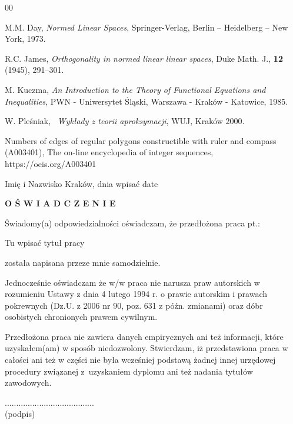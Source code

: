 \documentclass[12pt,oneside,a4paper]{book} %
\theoremstyle{break}
\begin{document}
\begin{thebibliography}{00}

M.M. Day, \textit{Normed Linear Spaces}, Springer-Verlag, Berlin
-- Heidelberg -- New York, 1973.

 R.C. James, \textit{Orthogonality in normed linear linear spaces}, Duke Math. J., {\bf
12} (1945), 291--301.

 M. Kuczma, \textit{An Introduction to the
Theory of Functional Equations and Inequalities}, PWN -
Uniwersytet Śląski, Warszawa - Kraków - Katowice, 1985.

W. Pleśniak, \  \textit{Wykłady z teorii aproksymacji}, WUJ,
Kraków 2000.

Numbers of edges of regular polygons constructible with ruler and compass (A003401), The on-line encyclopedia of integer sequences, https://oeis.org/A003401 

\end{thebibliography}
\newpage\thispagestyle{empty}
Imię i Nazwisko \hfill Kraków, dnia wpisać date\par\vspace{1cm}\par
\centerline{{\Large \bf O Ś W I A D C Z E N I E}}
\par\vspace{1.4cm}\par
Świadomy(a) odpowiedzialności oświadczam, że przedłożona praca pt.:
\begin{center}
{\sc Tu wpisać tytuł pracy}
\end{center}
została napisana przeze mnie samodzielnie.
\par
Jednocześnie oświadczam że w/w praca nie narusza praw autorskich w rozumieniu Ustawy z dnia 4 lutego 1994 r. o prawie autorskim i prawach pokrewnych (Dz.U. z 2006 nr 90, poz.
631 z późn. zmianami) oraz dóbr osobistych chronionych prawem cywilnym.
\par
Przedłożona praca nie zawiera danych empirycznych ani też informacji, które uzyskałem(am) w sposób niedozwolony. Stwierdzam, iż przedstawiona praca w całości ani też w części nie była wcześniej podstawą żadnej innej urzędowej procedury związanej z~uzyskaniem dyplomu ani też nadania tytułów zawodowych.
\par\vspace{1cm}\par
\begin{flushright}
....................................... \ \ \ \ \ \ \\
{\scriptsize (podpis)\hspace{2.3cm}\ }
\end{flushright}
\end{document}
